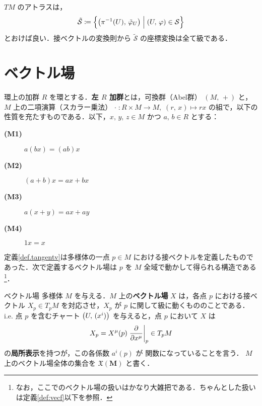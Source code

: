\documentclass[geometry_main]{subfiles}
\begin{document}
$TM$ のアトラスは，
\begin{align} 
	\tilde{\mathcal{S}} \coloneqq \Bigl\{ \bigl( \pi^{-1}(U),\, \tilde{\varphi}_U \bigr)  \Bigm| (U,\, \varphi) \in \mathcal{S} \Bigr\} 
\end{align}
とおけば良い．接ベクトルの変換則から $\tilde{\mathcal{S}}$ の座標変換は全て\cinfty 級である．

\section{ベクトル場}

\begin{myaxiom}[label=ax.module]{環上の加群}
	$R$ を環とする．\textbf{左 $R$ 加群}とは，可換群（Abel群） $(M,\, +)$ と，$M$ 上の二項演算（スカラー乗法） $\cdot\; \colon R \times M \to M,\; (r, \, x) \mapsto rx$ の組で，以下の性質を充たすものである．以下，$x,\, y,\, z \in M$ かつ $a,\, b \in R$ とする：
	\begin{description}
		\item[\textbf{(M1)}] $a(b x) = (ab) x$
		\item[\textbf{(M2)}] $(a+b)x = ax + bx$
		\item[\textbf{(M3)}] $a(x + y) = ax + ay$
		\item[\textbf{(M4)}] $1 x = x$ 
	\end{description}
\end{myaxiom}

定義\ref{def.tangentv}は\cinfty 多様体の一点 $p \in M$ における接ベクトルを定義したものであった．次で定義するベクトル場は $p$ を $M$ 全域で動かして得られる構造である\footnote{なお，ここでのベクトル場の扱いはかなり大雑把である．ちゃんとした扱いは定義\ref{def:vecf}以下を参照．}．

\begin{mydef}[label=vectorfield]{ベクトル場}
	\cinfty 多様体 $M$ を与える．$M$ 上の\cinfty \textbf{ベクトル場} $X$ は，各点 $p$ における接ベクトル $X_p \in T_pM$ を対応させ，$X_p$ が $p$ に関して\cinfty 級に動くもののことである．i.e. 点 $p$ を含むチャート $\bigl(U,\, (x^i)\bigr)$ を与えると，点 $p$ において $X$ は
	\begin{align}
		\label{eq.local}
		X_p = X^\mu(p) \eval{\pdv{}{x^\mu}}_p \in T_pM
	\end{align}
	の\textbf{局所表示}を持つが，この各係数 $a^i(p)$ が \cinfty 関数になっていることを言う．
	\tcblower	
	$M$ 上のベクトル場全体の集合を $\bm{\mathfrak{X}(M)}$ と書く．
\end{mydef}
\end{document}

